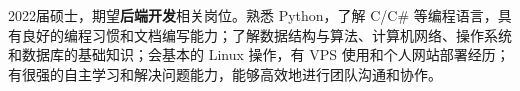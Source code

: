 {\onehalfspacing\hspace{2em}%
2022届硕士，期望\textbf{后端开发}相关岗位。熟悉 Python，了解 C/C\# 等编程语言，具有良好的编程习惯和文档编写能力；了解数据结构与算法、计算机网络、操作系统和数据库的基础知识；会基本的 Linux 操作，有 VPS 使用和个人网站部署经历；有很强的自主学习和解决问题能力，能够高效地进行团队沟通和协作。
\par}